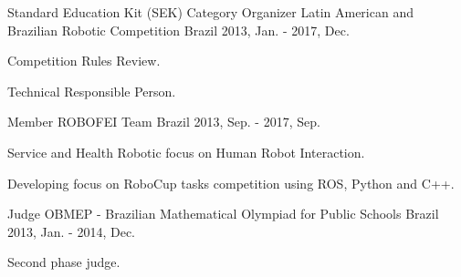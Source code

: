 

\begin{cventries}

  \cventry
    {Standard Education Kit (SEK) Category Organizer} %
    {Latin American and Brazilian Robotic Competition} %
    {Brazil} %
    {2013, Jan. - 2017, Dec.} %
    {
      \begin{cvitems} %
        \item {Competition Rules Review.}
        \item {Technical Responsible Person.}
      \end{cvitems}
    }

  \cventry
    {Member} %
    {ROBOFEI Team} %
    {Brazil} %
    {2013, Sep. - 2017, Sep.} %
    {
      \begin{cvitems} %
        \item {Service and Health Robotic focus on Human Robot Interaction.}
        \item {Developing focus on RoboCup \@home tasks competition using ROS, Python and C++.}
      \end{cvitems}
    }

  \cventry
    {Judge} %
    {OBMEP - Brazilian Mathematical Olympiad for Public Schools} %
    {Brazil} %
    {2013, Jan. - 2014, Dec.} %
    {
      \begin{cvitems} %
        \item {Second phase judge.}
      \end{cvitems}
    }

\end{cventries}
